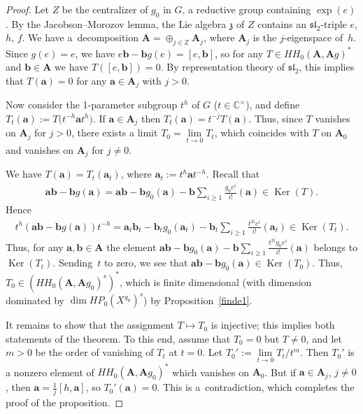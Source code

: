 \documentclass[11pt]{article}
\numberwithin{equation}{section}
\numberwithin{equation}{section}
\begin{document}
\begin{proof} Let $Z$ be the centralizer of $g_0$ in $G$, a reductive group containing $\exp(e)$. By the Jacobson--Morozov lemma, the Lie algebra $\mathfrak{z}$ of $Z$ contains an $\mathfrak{sl}_2$-triple
$e$, $h$, $f$. We have a~decomposition ${\mathbf A}=\oplus_{j\in {\mathbb Z}}{\mathbf A}_j$, where ${\mathbf A}_j$ is the $j$-eigenspace of~$h$. Since $g(e)=e$, we have $e{\mathbf b}-{\mathbf b}g(e)=[e,{\mathbf b}]$, so for any $T\in HH_0({\mathbf A},{\mathbf A}g)^*$ and ${\mathbf b}\in {\mathbf A}$ we have $T([e,{\mathbf b}])=0$. By representation theory of $\mathfrak{sl}_2$, this implies that $T({\mathbf a})=0$ for any ${\mathbf a}\in {\mathbf A}_j$ with $j>0$.

Now consider the 1-parameter subgroup $t^h$ of $G$ ($t\in {\mathbb C}^\times$), and define
$T_t({\mathbf a}):=T\big(t^{-h}{\mathbf a}t^h\big)$. If ${\mathbf a}\in {\mathbf A}_j$ then $T_t({\mathbf a})=t^{-j}T({\mathbf a})$. Thus, since $T$ vanishes on ${\mathbf A}_j$ for $j>0$, there exists a limit $T_0=\lim\limits_{t\to 0}T_t$, which coincides with $T$ on ${\mathbf A}_0$ and vanishes on ${\mathbf A}_j$ for $j\ne 0$.

We have $T({\mathbf a})=T_t({\mathbf a}_t)$, where ${\mathbf a}_t:=t^h{\mathbf a} t^{-h}$.
Recall that
\begin{gather*}
{\mathbf a}{\mathbf b}-{\mathbf b} g({\mathbf a})={\mathbf a}{\mathbf b}-{\mathbf b}g_0({\mathbf a})-{\mathbf b}\sum_{i\ge 1}\frac{g_0e^i}{i!}({\mathbf a})\in \operatorname{Ker}(T).
\end{gather*}
Hence
\begin{gather*}
t^h({\mathbf a}{\mathbf b}-{\mathbf b} g({\mathbf a}))t^{-h}={\mathbf a}_t{\mathbf b}_t-{\mathbf b}_t g_0({\mathbf a}_t)-{\mathbf b}_t\sum_{i\ge 1}\frac{t^{2i}e^i}{i!}({\mathbf a}_t)\in \operatorname{Ker}(T_t).
\end{gather*}
Thus, for any ${\mathbf a},{\mathbf b}\in {\mathbf A}$ the element ${\mathbf a}{\mathbf b}- {\mathbf b} g_0({\mathbf a})-{\mathbf b}\sum\limits_{i\ge 1}\frac{t^{2i}g_0e^i}{i!}({\mathbf a})$ belongs to $\operatorname{Ker}(T_t)$. Sending~$t$ to zero, we see that ${\mathbf a}{\mathbf b}-{\mathbf b} g_0({\mathbf a})\in \operatorname{Ker}(T_0)$. Thus, $T_0\in (HH_0({\mathbf A},{\mathbf A}g_0)^s)^*$, which is finite dimensional (with dimension dominated by $\dim HP_0(X^{g_0})^s$) by Proposition~\ref{finde1}.

It remains to show that the assignment $T\mapsto T_0$ is injective; this implies both statements of the theorem. To this end, assume that $T_0=0$ but $T\ne 0$, and let $m>0$ be the order of vanishing of $T_t$ at $t=0$. Let $T_0':=\lim\limits_{t\to 0}T_t/t^m$. Then $T_0'$ is a nonzero element of $HH_0({\mathbf A},{\mathbf A}g_0)^*$ which vanishes on ${\mathbf A}_0$. But if ${\mathbf a}\in {\mathbf A}_j$, $j\ne 0$, then ${\mathbf a}=\frac{1}{j}[h,{\mathbf a}]$, so $T_0'({\mathbf a})=0$. This is a~contradiction, which completes the proof of the proposition.
\end{proof}
\end{document}
